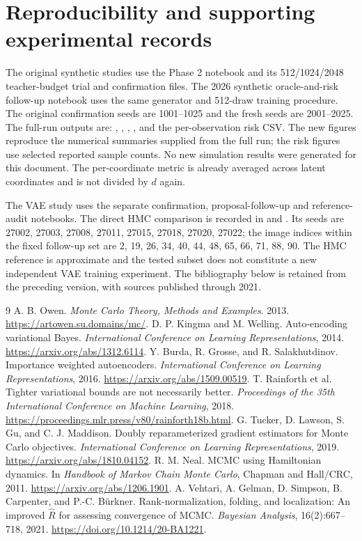 \documentclass[11pt,letterpaper]{article}
\begin{document}
\section*{Reproducibility and supporting experimental records}
The original synthetic studies use the Phase 2 notebook and its 512/1024/2048 teacher-budget trial and confirmation files. The 2026 synthetic oracle-and-risk follow-up notebook uses the same generator and 512-draw training procedure. The original confirmation seeds are 1001--1025 and the fresh seeds are 2001--2025. The full-run outputs are: , , , , and the per-observation risk CSV. The new figures reproduce the numerical summaries supplied from the full run; the risk figures use selected reported sample counts. No new simulation results were generated for this document. The per-coordinate metric is already averaged across latent coordinates and is not divided by $d$ again.

The VAE study uses the separate confirmation, proposal-follow-up and reference-audit notebooks. The direct HMC comparison is recorded in  and . Its seeds are 27002, 27003, 27008, 27011, 27015, 27018, 27020, 27022; the image indices within the fixed follow-up set are 2, 19, 26, 34, 40, 44, 48, 65, 66, 71, 88, 90. The HMC reference is approximate and the tested subset does not constitute a new independent VAE training experiment. The bibliography below is retained from the preceding version, with sources published through 2021.
\begin{thebibliography}{9}
 A. B. Owen. \emph{Monte Carlo Theory, Methods and Examples}. 2013. \url{https://artowen.su.domains/mc/}.
 D. P. Kingma and M. Welling. Auto-encoding variational Bayes. \emph{International Conference on Learning Representations}, 2014. \url{https://arxiv.org/abs/1312.6114}.
 Y. Burda, R. Grosse, and R. Salakhutdinov. Importance weighted autoencoders. \emph{International Conference on Learning Representations}, 2016. \url{https://arxiv.org/abs/1509.00519}.
 T. Rainforth et al. Tighter variational bounds are not necessarily better. \emph{Proceedings of the 35th International Conference on Machine Learning}, 2018. \url{https://proceedings.mlr.press/v80/rainforth18b.html}.
 G. Tucker, D. Lawson, S. Gu, and C. J. Maddison. Doubly reparameterized gradient estimators for Monte Carlo objectives. \emph{International Conference on Learning Representations}, 2019. \url{https://arxiv.org/abs/1810.04152}.
 R. M. Neal. MCMC using Hamiltonian dynamics. In \emph{Handbook of Markov Chain Monte Carlo}, Chapman and Hall/CRC, 2011. \url{https://arxiv.org/abs/1206.1901}.
 A. Vehtari, A. Gelman, D. Simpson, B. Carpenter, and P.-C. B\"urkner. Rank-normalization, folding, and localization: An improved $\widehat R$ for assessing convergence of MCMC. \emph{Bayesian Analysis}, 16(2):667--718, 2021. \url{https://doi.org/10.1214/20-BA1221}.
\end{thebibliography}
\end{document}

